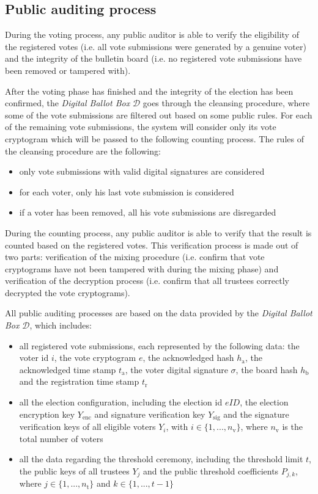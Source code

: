 \subsection{Public auditing process} \label{sec: public auditing process}
During the voting process, any public auditor is able to verify the eligibility of the registered votes (i.e. all vote submissions were generated by a genuine voter) and the integrity of the bulletin board (i.e. no registered vote submissions have been removed or tampered with).
 
After the voting phase has finished and the integrity of the election has been confirmed, the \textit{Digital Ballot Box} $\mathcal{D}$ goes through the cleansing procedure, where some of the vote submissions are filtered out based on some public rules. For each of the remaining vote submissions, the system will consider only its vote cryptogram which will be passed to the following counting process. The rules of the cleansing procedure are the following:
\begin{itemize}
    \item only vote submissions with valid digital signatures are considered
    \item for each voter, only his last vote submission is considered 
    \item if a voter has been removed, all his vote submissions are disregarded
\end{itemize}
 
During the counting process, any public auditor is able to verify that the result is counted based on the registered votes. This verification process is made out of two parts: verification of the mixing procedure (i.e. confirm that vote cryptograms have not been tampered with during the mixing phase) and verification of the decryption process (i.e. confirm that all trustees correctly decrypted the vote cryptograms).

All public auditing processes are based on the data provided by the \textit{Digital Ballot Box} $\mathcal{D}$, which includes:
\begin{itemize}
    \item all registered vote submissions, each represented by the following data: the voter id $i$, the vote cryptogram $e$, the acknowledged hash $h_\mathrm{a}$, the acknowledged time stamp $t_\mathrm{a}$, the voter digital signature $\sigma$, the board hash $h_\mathrm{b}$ and the registration time stamp $t_\mathrm{r}$
    \item all the election configuration, including the election id $eID$, the election encryption key $Y_\mathrm{enc}$ and signature verification key $Y_\mathrm{sig}$ and the signature verification keys of all eligible voters $Y_i$, with \( i \in \{ 1, ..., n_\mathrm{v} \} \), where $n_\mathrm{v}$ is the total number of voters
    \item all the data regarding the threshold ceremony, including the threshold limit $t$, the public keys of all trustees $Y_j$ and the public threshold coefficients $P_{j, k}$, where \( j \in \{ 1, ..., n_\mathrm{t} \} \) and \( k \in \{ 1, ..., t-1 \} \)
\end{itemize}

